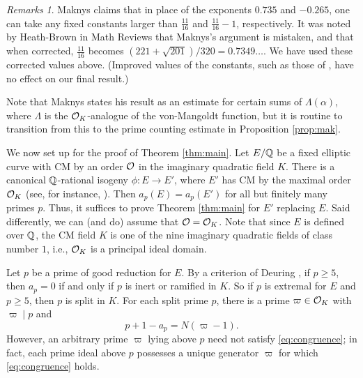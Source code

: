 \documentclass[12pt]{amsart}
\theoremstyle{remark}
\newtheorem*{rmks}{Remarks}
\begin{document}
\begin{rmks} Maknys claims that in place of the exponents $0.735$ and $-0.265$, one can take any fixed constants larger than $\frac{11}{16}$ and $\frac{11}{16}-1$, respectively. It was noted by Heath-Brown in Math Reviews that Maknys's argument is mistaken, and that when corrected, $\frac{11}{16}$ becomes $(221+\sqrt{201})/320 = 0.7349\dots$. We have used these corrected values above.
(Improved values of the constants, such as those of \cite{zarzycki91}, have no effect on our final result.)

Note that Maknys states his result as an estimate for certain sums of $\Lambda(\alpha)$, where $\Lambda$ is the $\mathcal{O}_K$-analogue of the von-Mangoldt function, but it is routine to transition from this to the prime counting estimate in Proposition \ref{prop:mak}.
\end{rmks}


We now set up for the proof of Theorem \ref{thm:main}. Let $E/\mathbb{Q}$ be a fixed elliptic curve with CM by an order $\mathcal{O}$ in the imaginary quadratic field $K$. There is a canonical $\mathbb{Q}$-rational isogeny $\phi\colon E\to E'$, where $E'$ has CM by the maximal order $\mathcal{O}_K$ (see, for instance, \cite[Proposition 25]{CCS13}). Then $a_p(E) = a_p(E')$ for all but finitely many primes $p$. Thus, it suffices to prove Theorem \ref{thm:main} for $E'$ replacing $E$. Said differently, we can (and do) assume that $\mathcal{O}=\mathcal{O}_K$. Note that since $E$ is defined over $\mathbb{Q}$, the CM field $K$ is one of the nine imaginary quadratic fields of class number $1$, i.e., $\mathcal{O}_K$ is a principal ideal domain.

Let $p$ be a prime of good reduction for $E$. By a criterion of Deuring \cite{deuring41}, if $p\ge 5$, then $a_p=0$ if and only if $p$ is inert or ramified in $K$. So if $p$ is extremal for $E$ and $p\ge 5$, then $p$ is split in $K$. For each split prime $p$, there is a prime $\varpi\in \mathcal{O}_K$ with $\varpi \mid p$ and 
\begin{equation}\label{eq:congruence} p+1-a_p = N(\varpi-1). \end{equation} However, an arbitrary prime $\varpi$ lying above $p$ need not satisfy \eqref{eq:congruence}; in fact, each prime ideal above $p$ possesses a unique generator $\varpi$ for which \eqref{eq:congruence} holds. 
\end{document}
